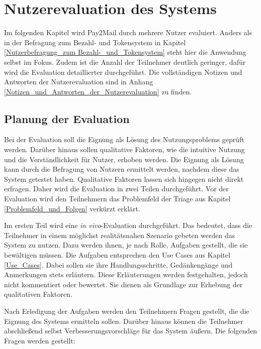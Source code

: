 
\chapter{Nutzerevaluation des Systems}
\label{Nutzerevaluation_des_Systems}

Im folgenden Kapitel wird Pay2Mail durch mehrere Nutzer evaluiert. Anders als in der Befragung zum Bezahl- und Tokensystem in Kapitel \ref{Nutzerbefragung_zum Bezahl-_und_Tokensystem} steht hier die Anwendung selbst im Fokus. Zudem ist die Anzahl der Teilnehmer deutlich geringer, dafür wird die Evaluation detaillierter durchgeführt. Die vollständigen Notizen und Antworten der Nutzerevaluation sind in Anhang \ref{Notizen_und_Antworten_der_Nutzerevaluation} zu finden.

\section{Planung der Evaluation}
\label{Planung_der_Evaluation}

Bei der Evaluation soll die Eignung als Lösung des Nutzungsproblems geprüft werden. Darüber hinaus sollen qualitative Faktoren, wie die intuitive Nutzung und die Verständlichkeit für Nutzer, erhoben werden. Die Eignung als Lösung kann durch die Befragung von Nutzern ermittelt werden, nachdem diese das System getestet haben. Qualitative Faktoren lassen sich hingegen nicht direkt erfragen. Daher wird die Evaluation in zwei Teilen durchgeführt. Vor der Evaluation wird den Teilnehmern das Problemfeld der Triage aus Kapitel \ref{Problemfeld_und_Folgen} verkürzt erklärt.

Im ersten Teil wird eine \textit{in vivo}-Evaluation durchgeführt. Das bedeutet, dass die Teilnehmer in einem möglichst realitätsnahen Szenario gebeten werden das System zu nutzen. Dazu werden ihnen, je nach Rolle, Aufgaben gestellt, die sie bewältigen müssen. Die Aufgaben entsprechen den Use Cases aus Kapitel \ref{Use_Cases}. Dabei sollen sie ihre Handlungsschritte, Gedänkengänge und Anmerkungen stets erläutern. Diese Erläuterungen werden festgehalten, jedoch nicht kommentiert oder bewertet. Sie dienen als Grundlage zur Erhebung der qualitativen Faktoren.

Nach Erledigung der Aufgaben werden den Teilnehmern Fragen gestellt, die die Eignung des Systems ermitteln sollen. Darüber hinaus können die Teilnehmer abschließend selbst Verbesserungsvorschläge für das System äußern. Die folgenden Fragen werden gestellt:


